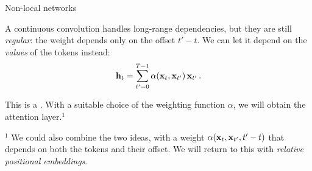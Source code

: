 \begin{frame}{Non-local networks}
    \setlength{\parskip}{6pt}

    A continuous convolution handles long-range dependencies, but they are
    still \textit{regular}: the weight depends only on the offset $t'-t$. We
    can let it depend on the \textit{values} of the tokens instead:
    \[
        \vc{h}_t=\sum_{t'=0}^{T-1}\eqnmarkbox[drawblue]{wnl}{\alpha(\vc{x}_t,\vc{x}_{t'})}\,\vc{x}_{t'}\,.
    \]
    \vspace{0.6em}

    This is a . With a suitable choice of
    the weighting function $\alpha$, we will obtain the attention layer.$^1$

    \vfill
    {\footnotesize\color{black!60} $^1$ We could also combine the two ideas, with a
        weight $\alpha(\vc{x}_t,\vc{x}_{t'},t'-t)$ that depends on both the tokens and
        their offset. We will return to this with \textit{relative positional
            embeddings}.\par}


\end{frame}

